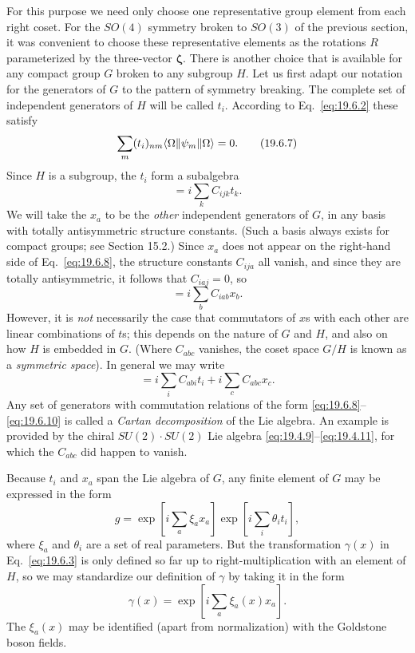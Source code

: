 For this purpose we need only choose one representative group element from each right coset. For the $SO(4)$ symmetry broken to $SO(3)$ of the previous section, it was convenient to choose these representative elements as the rotations $R$ parameterized by the three-vector $\boldsymbol\zeta$. There is another choice that is available for any compact group $G$ broken to any subgroup $H$. Let us first adapt our notation for the generators of $G$ to the pattern of symmetry breaking. The complete set of independent generators of $H$ will be called $t_i$. According to Eq.~\eqref{eq:19.6.2} these satisfy
\begin{equation}
\sum_m(t_i)_{nm}\langle \Omega\rVert\psi_m\lVert \Omega\rangle=0.
\tag{19.6.7}\label{eq:19.6.7}
\end{equation}
Since $H$ is a subgroup, the $t_i$ form a subalgebra
\begin{equation}
[t_i,t_j]=i\sum_k C_{ijk}t_k.
\tag{19.6.8}\label{eq:19.6.8}
\end{equation}
We will take the $x_a$ to be the \emph{other} independent generators of $G$, in any basis with totally antisymmetric structure constants. (Such a basis always exists for compact groups; see Section 15.2.) Since $x_a$ does not appear on the right-hand side of Eq.~\eqref{eq:19.6.8}, the structure constants $C_{ija}$ all vanish, and since they are totally antisymmetric, it follows that $C_{iaj}=0$, so
\begin{equation}
[t_i,x_a]=i\sum_b C_{iab}x_b.
\tag{19.6.9}\label{eq:19.6.9}
\end{equation}
However, it is \emph{not} necessarily the case that commutators of $x$s with each other are linear combinations of $t$s; this depends on the nature of $G$ and $H$, and also on how $H$ is embedded in $G$. (Where $C_{abc}$ vanishes, the coset space $G/H$ is known as a \emph{symmetric space}). In general we may write
\begin{equation}
[x_a,x_b]
=i\sum_i C_{abi}t_i+i\sum_c C_{abc}x_c.
\tag{19.6.10}\label{eq:19.6.10}
\end{equation}
Any set of generators with commutation relations of the form \eqref{eq:19.6.8}--\eqref{eq:19.6.10} is called a \emph{Cartan decomposition} of the Lie algebra. An example is provided by the chiral $SU(2)\cdot SU(2)$ Lie algebra \eqref{eq:19.4.9}--\eqref{eq:19.4.11}, for which the $C_{abc}$ did happen to vanish.

Because $t_i$ and $x_a$ span the Lie algebra of $G$, any finite element of $G$ may be expressed in the form
\begin{equation}
g=\exp\left[i\sum_a\xi_a x_a\right]
\exp\left[i\sum_i\theta_i t_i\right],
\tag{19.6.11}\label{eq:19.6.11}
\end{equation}
where $\xi_a$ and $\theta_i$ are a set of real parameters. But the transformation $\gamma(x)$ in Eq.~\eqref{eq:19.6.3} is only defined so far up to right-multiplication with an element of $H$, so we may standardize our definition of $\gamma$ by taking it in the form
\begin{equation}
\gamma(x)=\exp\left[i\sum_a\xi_a(x)x_a\right].
\tag{19.6.12}\label{eq:19.6.12}
\end{equation}
The $\xi_a(x)$ may be identified (apart from normalization) with the Goldstone boson fields.

